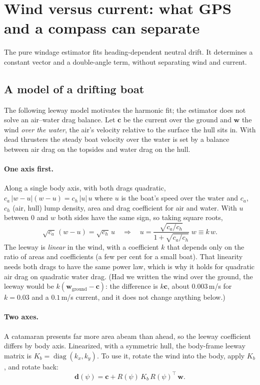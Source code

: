 \section{Wind versus current: what GPS and a compass can separate}
\label{sec:cond-observe}

The pure windage estimator fits heading-dependent neutral drift. It determines
a constant vector and a double-angle term, without separating wind and current.

\subsection{A model of a drifting boat}

The following leeway model motivates the harmonic fit; the estimator does not
solve an air--water drag balance. Let $\bm c$ be the current over the ground and $\bm w$ the wind \emph{over the
water}, the air's velocity relative to the surface the hull sits in. With dead
thrusters the steady boat velocity over the water is set by a balance between air
drag on the topsides and water drag on the hull.

\paragraph{One axis first.} Along a single body axis, with both drags quadratic,
$c_a\,|w-u|(w-u) = c_h\,|u|\,u$ where $u$ is the boat's speed over the water and $c_a$,
$c_h$ (air, hull) lump density, area and drag coefficient for air and water. With $u$ between 0
and $w$ both sides have the same sign, so taking square roots,
\[
  \sqrt{c_a}\,(w-u) = \sqrt{c_h}\,u \quad\Longrightarrow\quad
  u = \frac{\sqrt{c_a/c_h}}{1 + \sqrt{c_a/c_h}}\;w \equiv k\,w .
\]
The leeway is \emph{linear} in the wind, with a coefficient $k$ that depends only
on the ratio of areas and coefficients (a few per cent for a small boat). That
linearity needs both drags to have the same power law, which is why it holds for
quadratic air drag on quadratic water drag. (Had we written the wind over the
ground, the leeway would be $k(\bm w_\text{ground} - \bm c)$: the difference is $k\bm c$,
about $0.003$\,m/s for $k = 0.03$ and a $0.1$\,m/s current, and it does not change
anything below.)

\paragraph{Two axes.} A catamaran presents far more area abeam than ahead, so the
leeway coefficient differs by body axis. Linearized, with a symmetric hull, the
body-frame leeway matrix is $K_b = \operatorname{diag}(k_x, k_y)$. To use it, rotate
the wind into the body, apply $K_b$, and rotate back:
\[
  \bm d(\psi) = \bm c + R(\psi)\,K_b\,R(\psi)^\top\,\bm w .
\]

